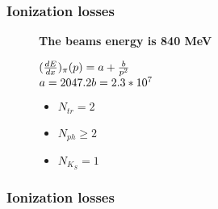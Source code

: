 \documentclass[14pt, hyperref = {colorlinks}]{beamer}
\begin{document}
\begin{frame}\label{r3}
\frametitle{Ionization losses}
\begin{figure}[h]
\center\textbf{The beams energy is 840 MeV}
\begin{minipage}[h]{0.69\linewidth}
\end{minipage}
\hfill
\begin{minipage}[h]{0.29\linewidth}
    \small{$({dE\over{dx}})_{\pi}(p) = a + {b\over{p^{2}}}$
    \\$a = 2047.2\\b = 2.3*10^{7}$}
    \begin{itemize}
        \item {$N_{tr} = 2$}
        \item {$N_{ph} \geq 2$}
        \item {$N_{K_{S}} = 1$}
    \end{itemize}
\end{minipage}
\end{figure}
\end{frame}

\begin{frame}
\frametitle{Ionization losses}
\begin{figure}[h]
\\
\\
 \begin{minipage}[h]{0.49\linewidth}
  \end{minipage}
  \hfill
  \begin{minipage}[h]{0.49\linewidth}
  \end{minipage}
   \small{}
\end{figure}
\end{frame}
\end{document}
